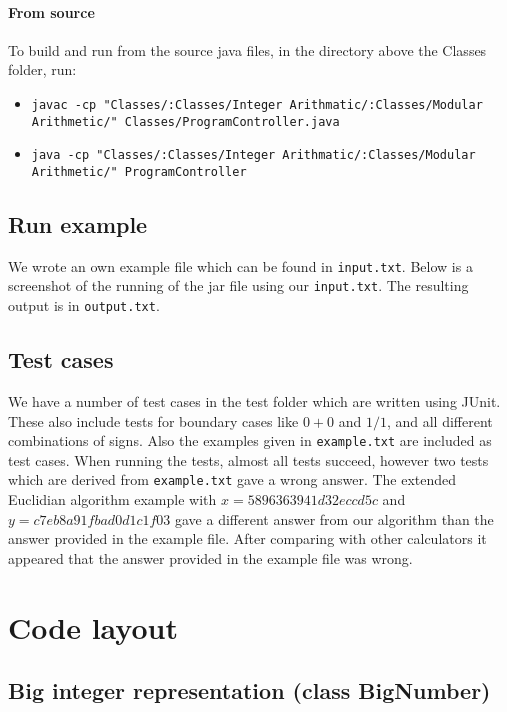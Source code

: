 \documentclass[a4paper]{article}
\begin{document}
\paragraph{From source}

To build and run from the source java files, in the directory above the Classes folder, run:

\begin{itemize}
\item \texttt{javac -cp "Classes/:Classes/Integer Arithmatic/:Classes/Modular Arithmetic/" Classes/ProgramController.java}
\item \texttt{java -cp "Classes/:Classes/Integer Arithmatic/:Classes/Modular Arithmetic/" ProgramController}
\end{itemize}



\subsection{Run example}

We wrote an own example file which can be found in \texttt{input.txt}.
Below is a screenshot of the running of the jar file using our \texttt{input.txt}.
The resulting output is in \texttt{output.txt}.


\subsection{Test cases}

We have a number of test cases in the test folder which are written using JUnit.
These also include tests for boundary cases like $0+0$ and $1/1$, and all different combinations of signs.
Also the examples given in \texttt{example.txt} are included as test cases.
When running the tests, almost all tests succeed, however two tests which are derived from \texttt{example.txt} gave a wrong answer.
The extended Euclidian algorithm example with $x=5896363941d32eccd5c$ and $y=c7eb8a91fbad0d1c1f03$ gave a different answer from our algorithm than
the answer provided in the example file.
After comparing with other calculators it appeared that the answer provided in the example file was wrong.




\section{Code layout}

\subsection{Big integer representation (class BigNumber)}
\end{document}
